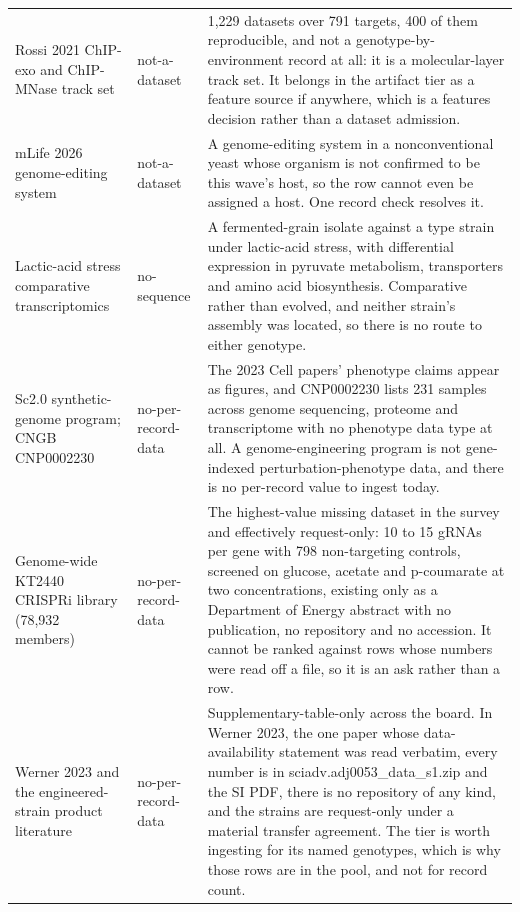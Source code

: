 \begin{longtable}{@{}L{58mm} L{26mm} L{88mm}@{}}
\addlinespace[5pt]
Rossi 2021 ChIP-exo and ChIP-MNase track set & not-a-dataset & 1,229 datasets over 791 targets, 400 of them reproducible, and not a genotype-by-environment record at all: it is a molecular-layer track set. It belongs in the artifact tier as a feature source if anywhere, which is a features decision rather than a dataset admission. \\
\addlinespace[5pt]
mLife 2026 genome-editing system & not-a-dataset & A genome-editing system in a nonconventional yeast whose organism is not confirmed to be this wave's host, so the row cannot even be assigned a host. One record check resolves it. \\
\addlinespace[5pt]
Lactic-acid stress comparative transcriptomics & no-sequence & A fermented-grain isolate against a type strain under lactic-acid stress, with differential expression in pyruvate metabolism, transporters and amino acid biosynthesis. Comparative rather than evolved, and neither strain's assembly was located, so there is no route to either genotype. \\
\addlinespace[5pt]
Sc2.0 synthetic-genome program; CNGB CNP0002230 & no-per-record-data & The 2023 Cell papers' phenotype claims appear as figures, and CNP0002230 lists 231 samples across genome sequencing, proteome and transcriptome with no phenotype data type at all. A genome-engineering program is not gene-indexed perturbation-phenotype data, and there is no per-record value to ingest today. \\
\addlinespace[5pt]
Genome-wide KT2440 CRISPRi library (78,932 members) & no-per-record-data & The highest-value missing dataset in the survey and effectively request-only: 10 to 15 gRNAs per gene with 798 non-targeting controls, screened on glucose, acetate and p-coumarate at two concentrations, existing only as a Department of Energy abstract with no publication, no repository and no accession. It cannot be ranked against rows whose numbers were read off a file, so it is an ask rather than a row. \\
\addlinespace[5pt]
Werner 2023 and the engineered-strain product literature & no-per-record-data & Supplementary-table-only across the board. In Werner 2023, the one paper whose data-availability statement was read verbatim, every number is in sciadv.adj0053\_data\_s1.zip and the SI PDF, there is no repository of any kind, and the strains are request-only under a material transfer agreement. The tier is worth ingesting for its named genotypes, which is why those rows are in the pool, and not for record count. \\

\end{longtable}

